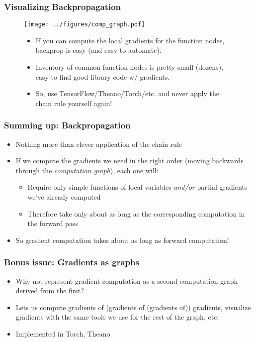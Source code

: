 \documentclass{beamer}
\begin{document}
\begin{frame}
\frametitle{Visualizing Backpropagation}

\begin{figure}[ht]
    \centering
    \begin{minipage}{0.48\textwidth}
        \centering
        \texttt{[image: ../figures/comp\_graph.pdf]}
    \end{minipage}
    \hfill
    \begin{minipage}{0.48\textwidth}
        \begin{itemize}
        \item If you can compute the local gradients for the function nodes, backprop is easy (and easy to automate).
        \item Inventory of common function nodes is pretty small (dozens), easy to find good library code w/ gradients.
        \item So, use TensorFlow/Theano/Torch/etc. and never apply the chain rule yourself again!
        \end{itemize}
    \end{minipage}
\end{figure}

\end{frame}


\begin{frame}
\frametitle{Summing up: Backpropagation}

\begin{itemize}
\item Nothing more than clever application of the chain rule
\item If we compute the gradients we need in the right order (moving backwards through the \textit{computation graph}), each one will:
\begin{itemize}
\item Require only simple functions of local variables \textit{and/or} partial gradients we've already computed
\item Therefore take only about as long as the corresponding computation in the forward pass
\end{itemize}
\item So gradient computation takes about as long as forward computation!
\end{itemize}

\end{frame}



\begin{frame}
\frametitle{Bonus issue: Gradients as graphs}

\begin{itemize}
\item Why not represent gradient computation as a second computation graph derived from the first?
\item Lets us compute gradients of (gradients of (gradients of)) gradients, visualize gradients with the same tools we use for the rest of the graph, etc.
\item Implemented in Torch, Theano
\end{itemize}

\end{frame}
\end{document}
